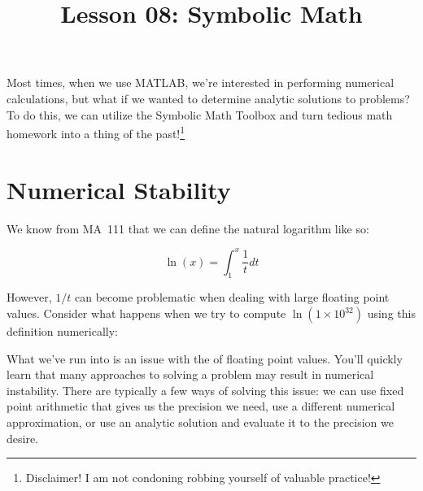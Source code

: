 \documentclass{article}
\title{Lesson 08: Symbolic Math}
\begin{document}
\renderTitle

Most times, when we use MATLAB, we're interested in performing numerical
calculations, but what if we wanted to determine analytic solutions to
problems?  To do this, we can utilize the Symbolic Math Toolbox%
 and turn
tedious math homework into a thing of the past!\footnote{Disclaimer!
I am not condoning robbing yourself of valuable practice!}

\section{Numerical Stability}

We know from MA~111 that we can define the natural logarithm like so:

\begin{equation}
	\ln(x)
	=
	\int^x_1
	\frac{1}{t}
	dt
\end{equation}

However, \(1 / t\) can become problematic when dealing with large
floating point values.  Consider what happens when we try to compute
\(\ln\left(1 \times 10^{32}\right)\) using this definition numerically:


What we've run into is an issue with the  of
floating point values.  You'll quickly learn that many approaches to
solving a problem may result in numerical instability.  There are
typically a few ways of solving this issue: we can use fixed point
arithmetic that gives us the precision we need, use a different
numerical approximation, or use an analytic solution and evaluate it to
the precision we desire.
\end{document}
